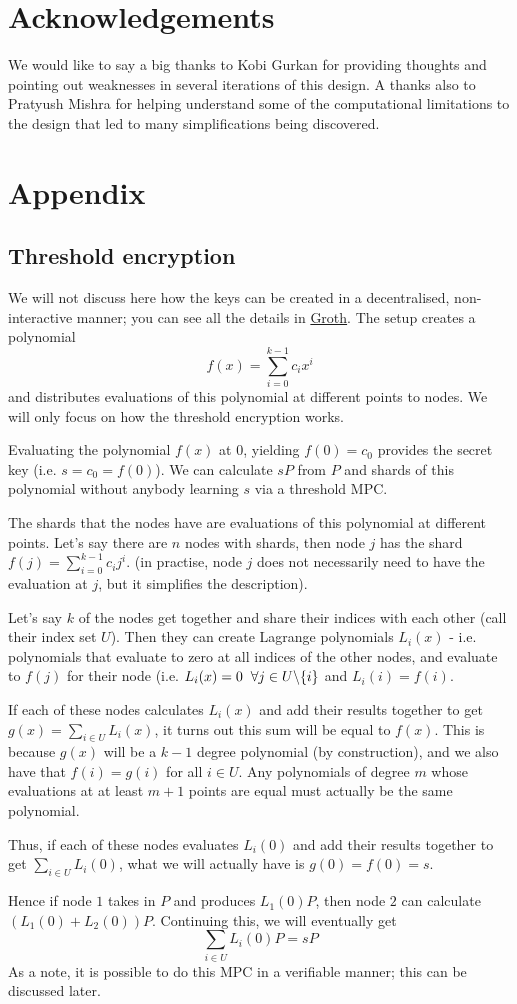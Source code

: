 \documentclass{article}
\begin{document}
\section{Acknowledgements}
We would like to say a big thanks to Kobi Gurkan for providing thoughts and pointing out weaknesses in several iterations of this design. A thanks also to Pratyush Mishra for helping understand some of the computational limitations to the design that led to many simplifications being discovered.

\section{Appendix}
\subsection{Threshold encryption}
We will not discuss here how the keys can be created in a decentralised, non-interactive manner; you can see all the details in \href{https://eprint.iacr.org/2021/339.pdf}{Groth}. The setup creates a polynomial 
$$f(x) = \sum_{i=0}^{k-1}c_ix^i$$ and distributes evaluations of this polynomial at different points to nodes. We will only focus on how the threshold encryption works.

Evaluating the polynomial $f(x)$ at $0$, yielding $f(0) = c_0$ provides the secret key (i.e. $s = c_0 = f(0)$). We can calculate $sP$ from $P$ and shards of this polynomial without anybody learning $s$ via a threshold MPC.

The shards that the nodes have are evaluations of this polynomial at different points. Let's say there are $n$ nodes with shards, then node $j$ has the shard $f(j) = \sum_{i=0}^{k-1}c_ij^i$. (in practise, node $j$ does not necessarily need to have the evaluation at $j$, but it simplifies the description).

Let's say $k$ of the nodes get together and share their indices with each other (call their index set $U$). Then they can create Lagrange polynomials $L_i(x)$ - i.e. polynomials that evaluate to zero at all indices of the other nodes, and evaluate to $f(j)$ for their node (i.e. $L_i(x) = 0 \hspace{2mm} \forall j \in U\backslash\{i\}$ and $L_i(i) = f(i)$.

If each of these nodes calculates $L_i(x)$ and add their results together to get $g(x)=\sum_{i\in U}L_i(x)$, it turns out this sum will be equal to $f(x)$. This is because $g(x)$ will be a $k-1$ degree polynomial (by construction), and we also have that $f(i)=g(i)$ for all $i\in U$. Any polynomials of degree $m$ whose evaluations at at least $m+1$ points are equal must actually be the same polynomial.

Thus, if each of these nodes evaluates $L_i(0)$ and add their results together to get $\sum_{i\in U}L_i(0)$, what we will actually have is $g(0)=f(0)=s$.

Hence if node $1$ takes in $P$ and produces $L_1(0)P$, then node $2$ can calculate $(L_1(0)+L_2(0))P$. Continuing this, we will eventually get
$$\sum_{i\in U}L_i(0)P = sP$$ As a note, it is possible to do this MPC in a verifiable manner; this can be discussed later.
\end{document}
